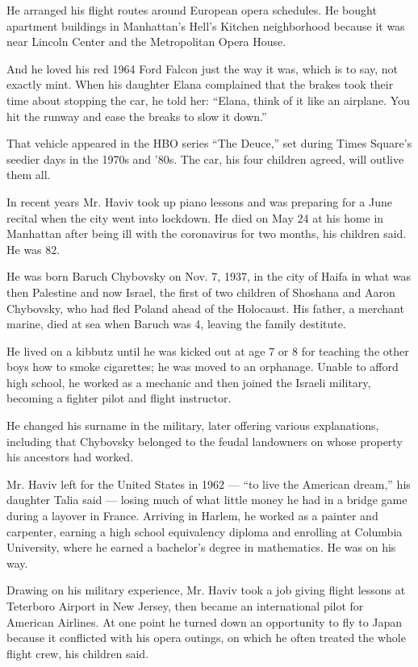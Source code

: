 He arranged his flight routes around European opera schedules. He bought
apartment buildings in Manhattan's Hell's Kitchen neighborhood because
it was near Lincoln Center and the Metropolitan Opera House.

And he loved his red 1964 Ford Falcon just the way it was, which is to
say, not exactly mint. When his daughter Elana complained that the
brakes took their time about stopping the car, he told her: ``Elana,
think of it like an airplane. You hit the runway and ease the breaks to
slow it down.''

That vehicle appeared in the HBO series ``The Deuce,'' set during Times
Square's seedier days in the 1970s and '80s. The car, his four children
agreed, will outlive them all.

In recent years Mr. Haviv took up piano lessons and was preparing for a
June recital when the city went into lockdown. He died on May 24 at his
home in Manhattan after being ill with the coronavirus for two months,
his children said. He was 82.

He was born Baruch Chybovsky on Nov. 7, 1937, in the city of Haifa in
what was then Palestine and now Israel, the first of two children of
Shoshana and Aaron Chybovsky, who had fled Poland ahead of the
Holocaust. His father, a merchant marine, died at sea when Baruch was 4,
leaving the family destitute.

He lived on a kibbutz until he was kicked out at age 7 or 8 for teaching
the other boys how to smoke cigarettes; he was moved to an orphanage.
Unable to afford high school, he worked as a mechanic and then joined
the Israeli military, becoming a fighter pilot and flight instructor.

He changed his surname in the military, later offering various
explanations, including that Chybovsky belonged to the feudal landowners
on whose property his ancestors had worked.

Mr. Haviv left for the United States in 1962 --- ``to live the American
dream,'' his daughter Talia said --- losing much of what little money he
had in a bridge game during a layover in France. Arriving in Harlem, he
worked as a painter and carpenter, earning a high school equivalency
diploma and enrolling at Columbia University, where he earned a
bachelor's degree in mathematics. He was on his way.

Drawing on his military experience, Mr. Haviv took a job giving flight
lessons at Teterboro Airport in New Jersey, then became an international
pilot for American Airlines. At one point he turned down an opportunity
to fly to Japan because it conflicted with his opera outings, on which
he often treated the whole flight crew, his children said.

